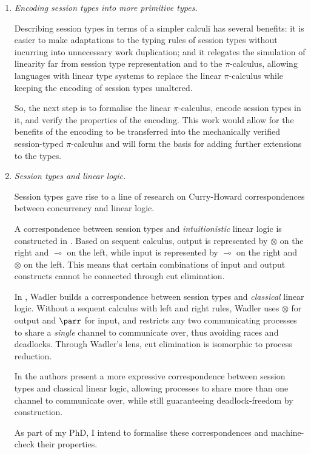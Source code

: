 \documentclass{mproj}
\newcommand{\picalc}{$\pi$-calculus}
\begin{document}
\begin{enumerate}[label=(\roman*), itemsep=1em]
    \item
        \emph{Encoding session types into more primitive types.}

        Describing session types in terms of a simpler calculi has several benefits: it is easier to make adaptations to the typing rules of session types without incurring into unnecessary work duplication; and it relegates the simulation of linearity far from session type representation and to the \picalc, allowing languages with linear type systems to replace the linear \picalc{} while keeping the encoding of session types unaltered.              

        So, the next step is to formalise the linear \picalc{}, encode session types in it, and verify the properties of the encoding. This work would allow for the benefits of the encoding to be transferred into the mechanically verified session-typed \picalc{} and will form the basis for adding further extensions to the types.

    \item
        \emph{Session types and linear logic.}

        Session types gave rise to a line of research on Curry-Howard correspondences \cite{Curry1980} between concurrency and linear logic.

        A correspondence between session types and \emph{intuitionistic} linear logic is constructed in \cite{Caires2010}. Based on sequent calculus, output is represented by $\otimes$ on the right and $\multimap$ on the left, while input is represented by $\multimap$ on the right and $\otimes$ on the left. This means that certain combinations of input and output constructs cannot be connected through cut elimination.

        In \cite{Wadler2014}, Wadler builds a correspondence between session types and \emph{classical} linear logic. Without a sequent calculus with left and right rules, Wadler uses $\otimes$ for output and $\parr$ for input, and restricts any two communicating processes to share a \emph{single} channel to communicate over, thus avoiding races and deadlocks.  Through Wadler's lens, cut elimination is isomorphic to process reduction. 

        In \cite{Dardha2018} the authors present a more expressive correspondence between session types and classical linear logic, allowing processes to share more than one channel to communicate over, while still guaranteeing deadlock-freedom by construction.

        As part of my PhD, I intend to formalise these correspondences and machine-check their properties.
\end{enumerate}
\end{document}
